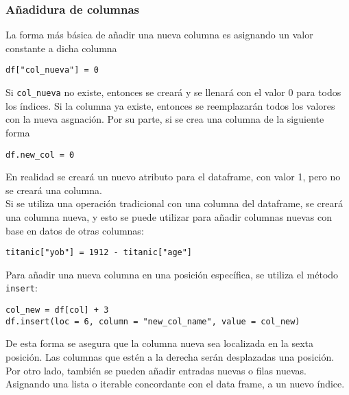 \subsubsection{Añadidura de columnas}
La forma más básica de añadir una nueva columna es asignando un valor constante a dicha columna
\begin{verbatim}
df["col_nueva"] = 0
\end{verbatim}
Si \texttt{col\_nueva} no existe, entonces se creará y se llenará con el valor 0 para todos los índices. Si la columna ya existe, entonces se reemplazarán todos los valores con la nueva asgnación. Por su parte, si se crea una columna de la siguiente forma
\begin{verbatim}
df.new_col = 0
\end{verbatim}
En realidad se creará un nuevo atributo para el dataframe, con valor 1, pero no se creará una columna.\\
Si se utiliza una operación tradicional con una columna del dataframe, se creará una columna nueva, y esto se puede utilizar para añadir columnas nuevas con base en datos de otras columnas:
\begin{verbatim}
titanic["yob"] = 1912 - titanic["age"]
\end{verbatim}
Para añadir una nueva columna en una posición específica, se utiliza el método \texttt{insert}:
\begin{verbatim}
col_new = df[col] + 3
df.insert(loc = 6, column = "new_col_name", value = col_new)
\end{verbatim}
De esta forma se asegura que la columna nueva sea localizada en la sexta posición. Las columnas que estén a la derecha serán desplazadas una posición.
Por otro lado, también se pueden añadir entradas nuevas o filas nuevas. Asignando una lista o iterable concordante con el data frame, a un nuevo índice.
